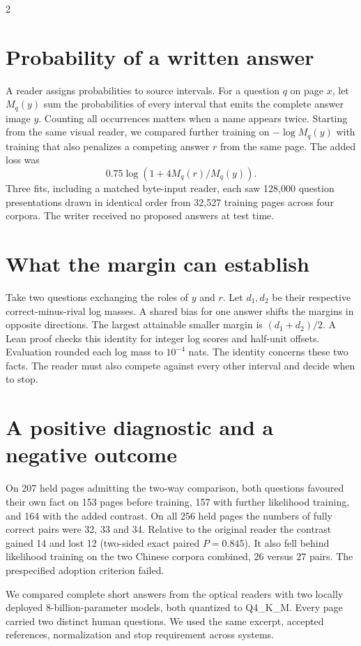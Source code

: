 \documentclass[10pt,a4paper]{article}
\newcommand{\spread}[1]{\noindent{\sffamily\bfseries\fontsize{19}{22}\selectfont #1\par}\vspace{4pt}}
\begin{document}
\begin{multicols}{2}
\section*{Probability of a written answer}
A reader assigns probabilities to source intervals. For a question $q$ on page $x$, let $M_q(y)$ sum the probabilities of every interval that emits the complete answer image $y$. Counting all occurrences matters when a name appears twice. Starting from the same visual reader, we compared further training on $-\log M_q(y)$ with training that also penalizes a competing answer $r$ from the same page. The added loss was
\[
0.75\log\!\left(1+4 M_q(r)/M_q(y)\right).
\]
Three fits, including a matched byte-input reader, each saw 128,000 question presentations drawn in identical order from 32,527 training pages across four corpora. The writer received no proposed answers at test time.
\section*{What the margin can establish}
Take two questions exchanging the roles of $y$ and $r$. Let $d_1,d_2$ be their respective correct-minus-rival log masses. A shared bias for one answer shifts the margins in opposite directions. The largest attainable smaller margin is $(d_1+d_2)/2$. A Lean proof checks this identity for integer log scores and half-unit offsets. Evaluation rounded each log mass to $10^{-4}$ nats. The identity concerns these two facts. The reader must also compete against every other interval and decide when to stop.
\section*{A positive diagnostic and a negative outcome}
On 207 held pages admitting the two-way comparison, both questions favoured their own fact on 153 pages before training, 157 with further likelihood training, and 164 with the added contrast. On all 256 held pages the numbers of fully correct pairs were 32, 33 and 34. Relative to the original reader the contrast gained 14 and lost 12 (two-sided exact paired $P=0.845$). It also fell behind likelihood training on the two Chinese corpora combined, 26 versus 27 pairs. The prespecified adoption criterion failed.
\end{multicols}
\newpage
\spread{What changes when the same model sees ink?}
\noindent We compared complete short answers from the optical readers with two locally deployed 8-billion-parameter models, both quantized to Q4\_K\_M. Every page carried two distinct human questions. We used the same excerpt, accepted references, normalization and stop requirement across systems.
\end{document}
